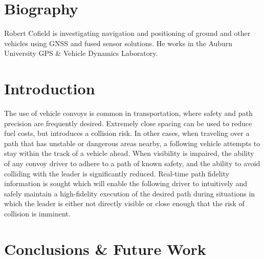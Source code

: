 \documentclass[twocolumn,10pt]{article}
\begin{document}

\section*{Biography}

  Robert Cofield is investigating navigation and positioning of ground and other vehicles using GNSS and fused sensor solutions. He works in the Auburn University GPS \& Vehicle Dynamics Laboratory.


\section*{Introduction}

  The use of vehicle convoys is common in transportation, where safety and path precision are frequently desired.  Extremely close spacing can be used to reduce fuel costs, but introduces a collision risk.  In other cases, when traveling over a path that has unstable or dangerous areas nearby, a following vehicle attempts to stay within the track of a vehicle ahead. When visibility is impaired, the ability of any convoy driver to adhere to a path of known safety, and the ability to avoid colliding with the leader is significantly reduced. Real-time path fidelity information is sought which will enable the following driver to intuitively and safely maintain a high-fidelity execution of the desired path during situations in which the leader is either not directly visible or close enough that the risk of collision is imminent.



\section*{Conclusions \& Future Work}



\nocite{ScottThesis}

\end{document}
